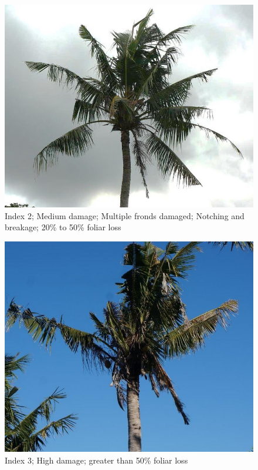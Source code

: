 \documentclass[twocolumn,letterpaper]{scrartcl}
\begin{document}
\begin{figure}[h!]
	\centering
	\includegraphics[width=.8\linewidth]{images/j5index2.resized.png}
	\caption{Index 2; Medium damage; Multiple fronds damaged; Notching and breakage; 20\% to 50\% foliar loss}
	\label{fig:damage2}
\end{figure}

\begin{figure}[h!]
	\centering
	\includegraphics[width=.8\linewidth]{images/j5index3.resized.png}
	\caption{Index 3; High damage; greater than 50\% foliar loss}
	\label{fig:damage3}
\end{figure}
\end{document}
